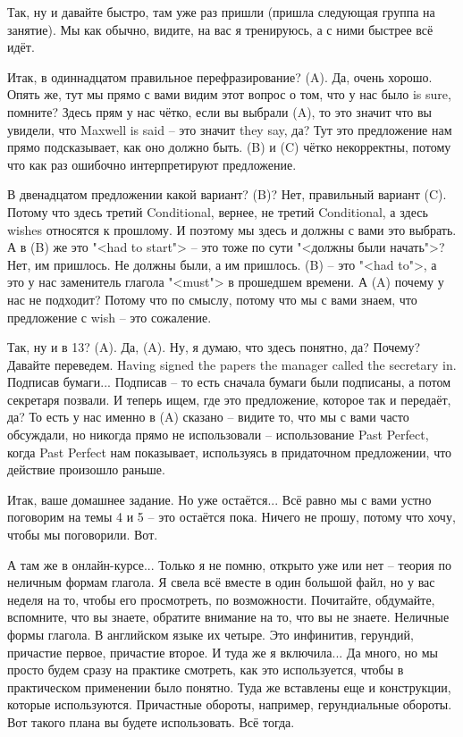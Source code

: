 \documentclass[main.tex]{subfiles}
\begin{document}
Так, ну и давайте быстро, там уже раз пришли (пришла следующая группа на занятие).
Мы как обычно, видите, на вас я тренируюсь, а с ними быстрее всё идёт.

Итак, в одиннадцатом правильное перефразирование?
(A).
Да, очень хорошо.
Опять же, тут мы прямо с вами видим этот вопрос о том, что у нас было is sure, помните?
Здесь прям у нас чётко, если вы выбрали (A), то это значит что вы увидели, что Maxwell is said -- это значит they say, да?
Тут это предложение нам прямо подсказывает, как оно должно быть.
(B) и (C) чётко некорректны, потому что как раз ошибочно интерпретируют предложение.

В двенадцатом предложении какой вариант?
(B)?
Нет, правильный вариант (C).
Потому что здесь третий Conditional, вернее, не третий Conditional, а здесь wishes относятся к прошлому.
И поэтому мы здесь и должны с вами это выбрать.
А в (B) же это "<had to start"> -- это тоже по сути "<должны были начать">?
Нет, им пришлось.
Не должны были, а им пришлось.
(B) -- это "<had to">, а это у нас заменитель глагола "<must"> в прошедшем времени.
А (A) почему у нас не подходит?
Потому что по смыслу, потому что мы с вами знаем, что предложение с wish -- это сожаление.

Так, ну и в 13?
(A).
Да, (A).
Ну, я думаю, что здесь понятно, да?
Почему?
Давайте переведем.
Having signed the papers the manager called the secretary in.
Подписав бумаги...
Подписав -- то есть сначала бумаги были подписаны, а потом секретаря позвали.
И теперь ищем, где это предложение, которое так и передаёт, да?
То есть у нас именно в (A) сказано -- видите то, что мы с вами часто обсуждали, но никогда прямо не использовали -- использование Past Perfect, когда Past Perfect нам показывает, используясь в придаточном предложении, что действие произошло раньше.

Итак, ваше домашнее задание.
Но уже остаётся...
Всё равно мы с вами устно поговорим на темы 4 и 5 -- это остаётся пока.
Ничего не прошу, потому что хочу, чтобы мы поговорили.
Вот.

А там же в онлайн-курсе...
Только я не помню, открыто уже или нет -- теория по неличным формам глагола.
Я свела всё вместе в один большой файл, но у вас неделя на то, чтобы его просмотреть, по возможности.
Почитайте, обдумайте, вспомните, что вы знаете, обратите внимание на то, что вы не знаете.
Неличные формы глагола.
В английском языке их четыре.
Это инфинитив, герундий, причастие первое, причастие второе.
И туда же я включила...
Да много, но мы просто будем сразу на практике смотреть, как это используется, чтобы в практическом применении было понятно.
Туда же вставлены еще и конструкции, которые используются.
Причастные обороты, например, герундиальные обороты.
Вот такого плана вы будете использовать.
Всё тогда.
\end{document}
